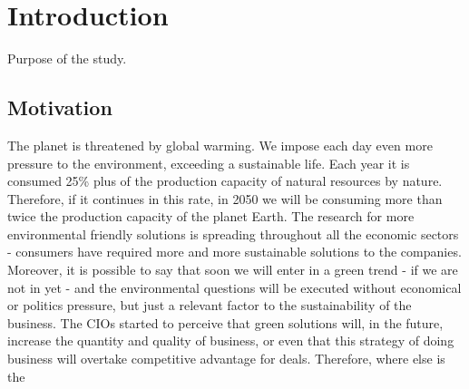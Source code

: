


\chapter{Introduction} \label{chap1:introduction}
Purpose of the study.

\section{Motivation} \label{sec1:motivation}

    The planet is threatened by global warming. We impose each day even more pressure to the environment, exceeding a sustainable life. Each year it is consumed 25\% plus of the production capacity of natural resources by nature. Therefore, if it continues in this rate, in 2050 we will be consuming more than twice the production capacity of the planet Earth\cite{Townsend:2002:2050}. 
    The research for more environmental friendly solutions is spreading throughout all the economic sectors - consumers have required more and more sustainable solutions to the companies. Moreover, it is possible to say that soon we will enter in a green trend - if we are not in yet - and the environmental questions will be executed without economical or politics pressure, but just a relevant factor to the sustainability of the business. The CIOs started to perceive that green solutions will, in the future, increase the quantity and quality of business, or even that this strategy of doing business will overtake competitive advantage for deals.
    Therefore, where else is the 
    
